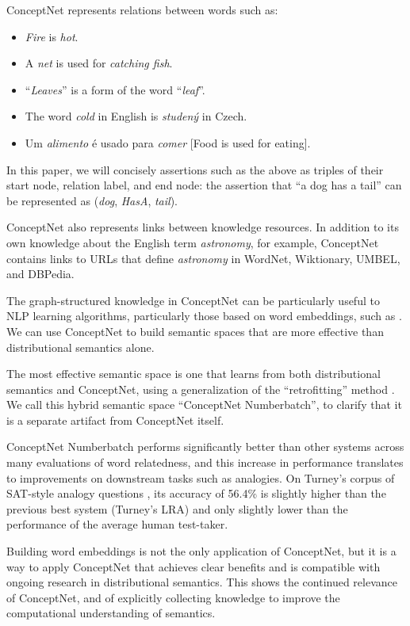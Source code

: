 \documentclass[letterpaper]{article}
\begin{document}
ConceptNet represents relations between words such as:

\begin{itemize}
    \item \emph{Fire} is \emph{hot}.
    \item A \emph{net} is used for \emph{catching fish}.
    \item ``\emph{Leaves}'' is a form of the word ``\emph{leaf}''.
    \item The word \emph{cold} in English is \emph{studený} in Czech.
    \item Um \emph{alimento} é usado para \emph{comer} [Food is used for eating].
\end{itemize}

In this paper, we will concisely assertions such as the above as triples of
their start node, relation label, and end node: the assertion that ``a dog has
a tail'' can be represented as (\emph{dog}, \emph{HasA}, \emph{tail}).

ConceptNet also represents links between knowledge resources. In addition to
its own knowledge about the English term \emph{astronomy}, for example,
ConceptNet contains links to URLs that define \emph{astronomy} in WordNet,
Wiktionary, UMBEL, and DBPedia.

The graph-structured knowledge in ConceptNet can be particularly useful to NLP
learning algorithms, particularly those based on word embeddings, such as
\cite{mikolov2013word2vec}. We can use ConceptNet to build semantic spaces that
are more effective than distributional semantics alone.

The most effective semantic space is one that learns from both distributional
semantics and ConceptNet, using a generalization of the ``retrofitting'' method
\cite{faruqui2015retrofitting}. We call this hybrid semantic space ``ConceptNet
Numberbatch'', to clarify that it is a separate artifact from ConceptNet
itself.

ConceptNet Numberbatch performs significantly better than other systems across
many evaluations of word relatedness, and this increase in performance
translates to improvements on downstream tasks such as analogies.  On Turney's
corpus of SAT-style analogy questions \cite{turney2005lra}, its accuracy of
56.4\% is slightly higher than the previous best system (Turney's LRA) and only
slightly lower than the performance of the average human test-taker.

Building word embeddings is not the only application of ConceptNet, but it is a
way to apply ConceptNet that achieves clear benefits and is compatible with
ongoing research in distributional semantics. This shows the continued relevance of
ConceptNet, and of explicitly collecting knowledge to improve the computational
understanding of semantics.
\end{document}

